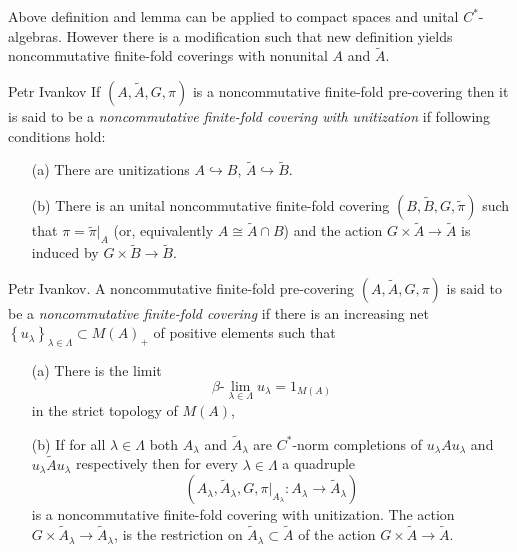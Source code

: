 \documentclass{beamer}
\theoremstyle{plain}
\newcommand{\hookto}{\hookrightarrow}        %
\begin{document}
\begin{frame}

Above definition and lemma can be applied to compact spaces and unital $C^*$-algebras. However there is a modification such that new definition yields noncommutative finite-fold coverings with nonunital $A$ and $\widetilde{A}$.


	\begin{definition}\label{fin_comp_defn}\alert{Petr  Ivankov}
		If $\left(A, \widetilde{A}, G, \pi \right)$ is a noncommutative finite-fold  pre-covering then it is said to be 	a \textit{noncommutative finite-fold covering with unitization} if following conditions hold:
		\begin{enumerate}
			\item[(a)] 
			There are unitizations $A \hookto B$, $\widetilde{A} \hookto \widetilde{B}$.
			\item[(b)] There is an %
			unital  noncommutative finite-fold covering	$\left(B ,\widetilde{B}, G, \widetilde{\pi} \right)$ such that $\pi = \widetilde{\pi}|_A$ (or, equivalently $A \cong \widetilde{A}\cap B$) and the action $G \times\widetilde{A} \to \widetilde{A}$ is induced by $G \times\widetilde{B} \to \widetilde{B}$.
		\end{enumerate}
	\end{definition}
\end{frame}
\begin{frame}
\begin{definition}
	\alert{Petr Ivankov}.	A   noncommutative finite-fold  pre-covering $\left(A, \widetilde{A}, G, \pi \right)$ is said to be  a \textit{noncommutative finite-fold covering} if there is an increasing net $\left\{u_\lambda\right\}_{\lambda\in\Lambda}\subset M\left( A\right)_+ $  of positive elements such that
	\begin{enumerate}
		\item[(a)] There is the limit 
		$$
		\beta\text{-}\lim_{\lambda \in \Lambda} u_\lambda = 1_{M\left(A \right) }
		$$
		in the strict topology of $M\left(A \right)$,
		\item[(b)]  If for all   $\lambda\in\Lambda$ both $A_\lambda$ and  $\widetilde A_\lambda$ are $C^*$-norm completions  of $u_\lambda A u_\lambda$ and  $u_\lambda\widetilde{A}u_\lambda$ respectively then for every $\lambda\in\Lambda$ a quadruple
		$$
		\left(A_\lambda, \widetilde{A}_\lambda, G, \left.\pi\right|_{A_\lambda} :A_\lambda\to \widetilde{A}_\lambda\right)	
		$$
		is a noncommutative finite-fold covering with unitization. The action 	$G \times \widetilde{A}_\lambda\to \widetilde{A}_\lambda$, is the restriction on $\widetilde{A}_\lambda\subset \widetilde{   A}$ of the action $G\times  \widetilde{A}\to \widetilde{A}$.
	\end{enumerate}
	
\end{definition}
\end{frame}
\end{document}
